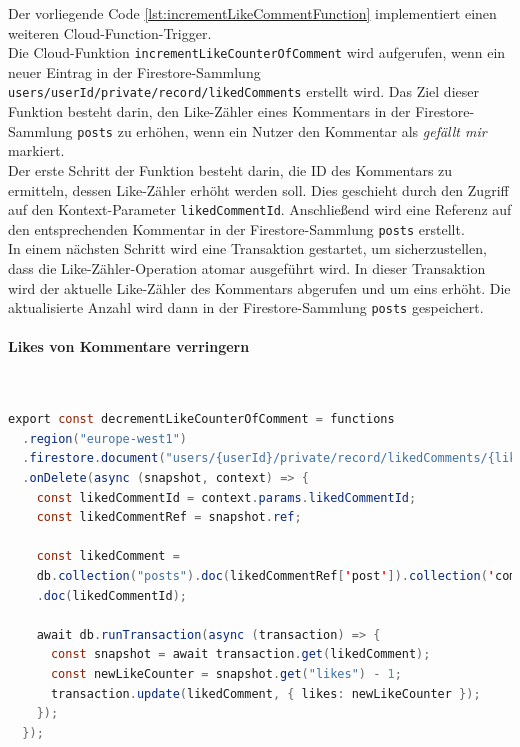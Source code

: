 Der vorliegende Code \ref{lst:incrementLikeCommentFunction} implementiert einen weiteren Cloud-Function-Trigger.
\\
Die Cloud-Funktion \texttt{incrementLikeCounterOfComment} wird aufgerufen, wenn ein neuer Eintrag in der Firestore-Sammlung \texttt{users/{userId}/private/record/likedComments} erstellt wird. Das Ziel dieser Funktion besteht darin, den Like-Zähler eines Kommentars in der Firestore-Sammlung \texttt{posts} zu erhöhen, wenn ein Nutzer den Kommentar als \textit{gefällt mir} markiert.
\\
Der erste Schritt der Funktion besteht darin, die ID des Kommentars zu ermitteln, dessen Like-Zähler erhöht werden soll. Dies geschieht durch den Zugriff auf den Kontext-Parameter \texttt{likedCommentId}. Anschließend wird eine Referenz auf den entsprechenden Kommentar in der Firestore-Sammlung \texttt{posts} erstellt.
\\
In einem nächsten Schritt wird eine Transaktion gestartet, um sicherzustellen, dass die Like-Zähler-Operation atomar ausgeführt wird. In dieser Transaktion wird der aktuelle Like-Zähler des Kommentars abgerufen und um eins erhöht. Die aktualisierte Anzahl wird dann in der Firestore-Sammlung \texttt{posts} gespeichert.

\paragraph{Likes von Kommentare verringern}\mbox{} \\

\begin{lstlisting}[language=Java,caption=decrementLikeCounterOfComment Funktion,label=lst:decrementLikeCommentFunction]
  export const decrementLikeCounterOfComment = functions
  .region("europe-west1")
  .firestore.document("users/{userId}/private/record/likedComments/{likedCommentId}")
  .onDelete(async (snapshot, context) => {
    const likedCommentId = context.params.likedCommentId;
    const likedCommentRef = snapshot.ref;

    const likedComment =
    db.collection("posts").doc(likedCommentRef['post']).collection('comments')
    .doc(likedCommentId);

    await db.runTransaction(async (transaction) => {
      const snapshot = await transaction.get(likedComment);
      const newLikeCounter = snapshot.get("likes") - 1;
      transaction.update(likedComment, { likes: newLikeCounter });
    });
  });
\end{lstlisting}


